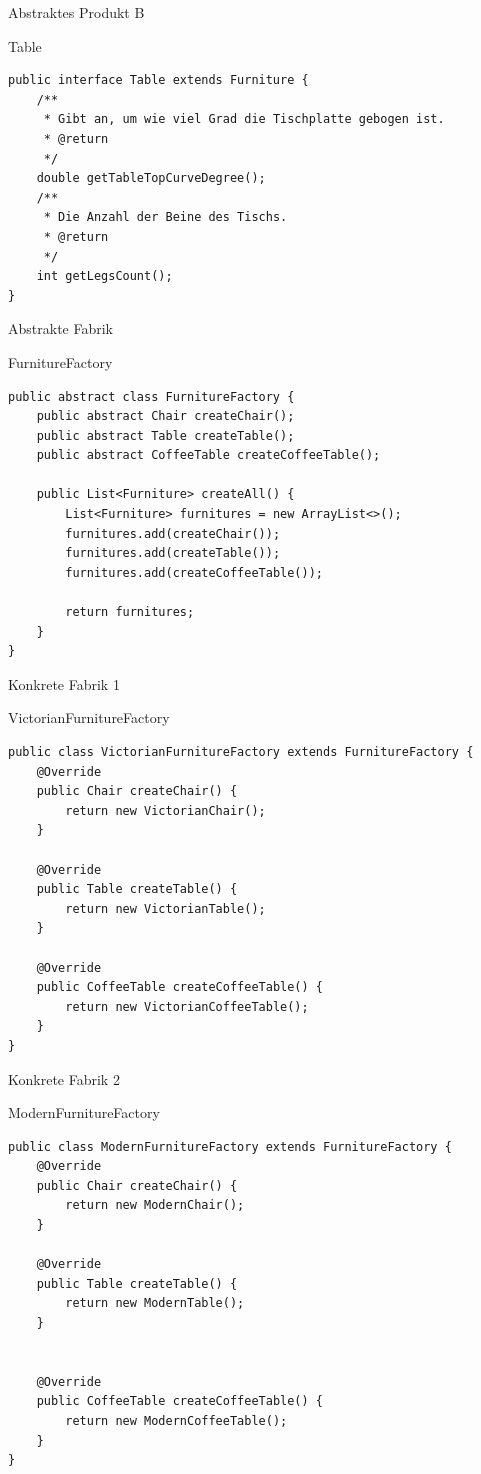 \begin{frame}[fragile]{Abstraktes Produkt B}
	\begin{exampleblock}{Table}
 		\begin{lstlisting}
public interface Table extends Furniture {
	/**
	 * Gibt an, um wie viel Grad die Tischplatte gebogen ist.
	 * @return 
	 */
	double getTableTopCurveDegree();
	/**
	 * Die Anzahl der Beine des Tischs.
	 * @return
	 */
	int getLegsCount();
}
        \end{lstlisting}
 	\end{exampleblock}
\end{frame}

\begin{frame}[fragile]{Abstrakte Fabrik}
	\begin{exampleblock}{FurnitureFactory}
 		\begin{lstlisting}
public abstract class FurnitureFactory {
	public abstract Chair createChair();
	public abstract Table createTable();
	public abstract CoffeeTable createCoffeeTable();
	
	public List<Furniture> createAll() {
		List<Furniture> furnitures = new ArrayList<>();
		furnitures.add(createChair());
		furnitures.add(createTable());
		furnitures.add(createCoffeeTable());
		
		return furnitures;
	}
}
        \end{lstlisting}
 	\end{exampleblock}
\end{frame}

\begin{frame}[fragile]{Konkrete Fabrik 1}
	\begin{exampleblock}{VictorianFurnitureFactory}
 		\begin{lstlisting}
public class VictorianFurnitureFactory extends FurnitureFactory {
	@Override
	public Chair createChair() {
		return new VictorianChair();
	}

	@Override
	public Table createTable() {
		return new VictorianTable();
	}

	@Override
	public CoffeeTable createCoffeeTable() {
		return new VictorianCoffeeTable();
	}
}
        \end{lstlisting}
 	\end{exampleblock}
\end{frame}

\begin{frame}[fragile]{Konkrete Fabrik 2}
	\begin{exampleblock}{ModernFurnitureFactory}
 		\begin{lstlisting}
public class ModernFurnitureFactory extends FurnitureFactory {
	@Override
	public Chair createChair() {
		return new ModernChair();
	}

	@Override
	public Table createTable() {
		return new ModernTable();
	}
	

	@Override
	public CoffeeTable createCoffeeTable() {
		return new ModernCoffeeTable();
	}
}
        \end{lstlisting}
 	\end{exampleblock}
\end{frame}

